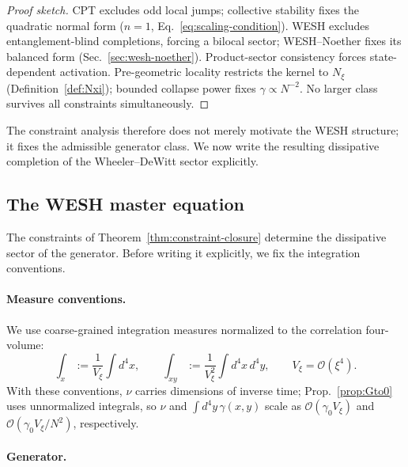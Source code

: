 \documentclass[12pt,a4paper]{article}
\numberwithin{equation}{section}
\begin{document}
\begin{proof}[Proof sketch]
CPT excludes odd local jumps; collective stability fixes the quadratic normal form ($n = 1$, Eq.~\eqref{eq:scaling-condition}). WESH excludes entanglement-blind completions, forcing a bilocal sector; WESH--Noether fixes its balanced form (Sec.~\ref{sec:wesh-noether}). Product-sector consistency forces state-dependent activation. Pre-geometric locality restricts the kernel to $N_\xi$ (Definition~\ref{def:Nxi}); bounded collapse power fixes $\gamma \propto N^{-2}$. No larger class survives all constraints simultaneously.
\end{proof}

\noindent The constraint analysis therefore does not merely motivate the WESH structure; it fixes the admissible generator class. We now write the resulting dissipative completion of the Wheeler--DeWitt sector explicitly.

\vspace{0.3cm}
\subsection{The WESH master equation}

\vspace{0.5cm}

\noindent The constraints of Theorem~\ref{thm:constraint-closure} determine the dissipative sector of the 
generator. Before writing it explicitly, we fix the integration conventions.

\paragraph{Measure conventions.}
We use coarse-grained integration measures normalized to the correlation four-volume:
\begin{equation}
\int_x := \frac{1}{V_\xi}\int d^4x,\qquad
\int_{xy}:=\frac{1}{V_\xi^2}\int d^4x\,d^4y,
\qquad V_\xi = \mathcal{O}(\xi^4).
\label{eq:measure-conventions}
\end{equation}
With these conventions, $\nu$ carries dimensions of inverse time; Prop.~\ref{prop:Gto0} uses unnormalized integrals, so $\nu$ and $\int d^4y\,\gamma(x,y)$ scale as $\mathcal{O}(\gamma_0 V_\xi)$ and $\mathcal{O}(\gamma_0 V_\xi/N^2)$, respectively.

\paragraph{Generator.}
\end{document}
